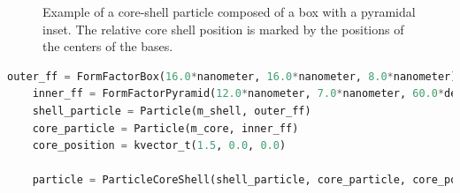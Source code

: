 \begin{figure}[ht]
\hfill
{}
\hfill
{}
\hfill
\caption{Example of a core-shell particle composed of a box with a pyramidal  inset. The relative core shell position is marked by the positions of the centers of the bases. }
\label{fig:coreshell}
\end{figure}

\clearpage

\begin{lstlisting}[language=python,
  style=eclipseboxed,numbers=none,nolol,caption={\Code{Python} script
    to create a core-shell particle made of a box with a pyramidal shifted inset.},label={lst:cshellsample}]
    outer_ff = FormFactorBox(16.0*nanometer, 16.0*nanometer, 8.0*nanometer) 
    inner_ff = FormFactorPyramid(12.0*nanometer, 7.0*nanometer, 60.0*degree)
    shell_particle = Particle(m_shell, outer_ff)
    core_particle = Particle(m_core, inner_ff)
    core_position = kvector_t(1.5, 0.0, 0.0)

    particle = ParticleCoreShell(shell_particle, core_particle, core_position)
\end{lstlisting}

